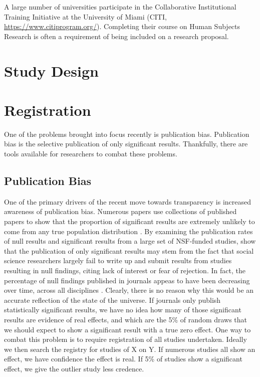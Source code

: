 \documentclass[12pt] {article}
\begin{document}
A large number of universities participate in the Collaborative
Institutional Training Initiative at the University of Miami (CITI,
\url{https://www.citiprogram.org/}). Completing their course on Human
Subjects Research is often a requirement of being included on a research
proposal.
\section{Study Design}\label{study-design}

\section{Registration}\label{registration}

One of the problems brought into focus recently is publication bias.
Publication bias is the selective publication of only significant
results. Thankfully, there are tools available for researchers to combat
these problems.

\subsection{Publication Bias}\label{publication-bias}

One of the primary drivers of the recent move towards transparency is
increased awareness of publication bias. Numerous papers use collections
of published papers to show that the proportion of significant results
are extremely unlikely to come from any true population distribution
\citep{delong_are_1992, gerber_testing_2001,  ioannidis_why_2005}. By examining the publication rates of null results and
significant results from a large set of NSF-funded studies, \cite{franco_publication_2014} show that the publication of only
significant results may stem from the fact that social science
researchers largely fail to write up and submit results from studies
resulting in null findings, citing lack of interest or fear of
rejection. In fact, the percentage of null findings published in
journals appeas to have been decreasing over time, across all
disciplines \citep{fanelli_negative_2012}. Clearly, there is no reason why this would
be an accurate reflection of the state of the universe. If journals only
publish statistically significant results, we have no idea how many of
those significant results are evidence of real effects, and which are
the 5\% of random draws that we should expect to show a significant
result with a true zero effect. One way to combat this problem is to
require registration of all studies undertaken. Ideally we then search
the registry for studies of X on Y. If numerous studies all show an
effect, we have confidence the effect is real. If 5\% of studies show a
significant effect, we give the outlier study less credence.
\end{document}
